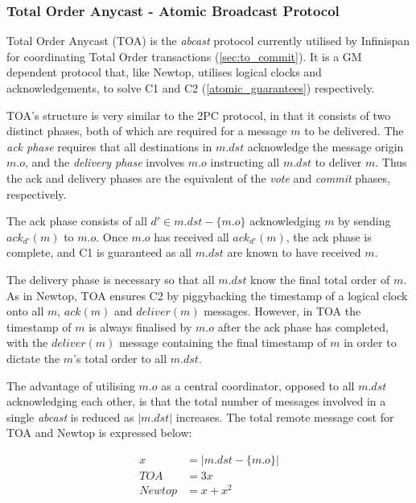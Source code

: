 	        \subsubsection{Total Order Anycast - Atomic Broadcast Protocol}
	        Total Order Anycast (TOA)\cite{Ruivo:2011:ETO:2120967.2121604} is the \emph{abcast} protocol currently utilised by Infinispan for coordinating Total Order transactions (\ref{sec:to_commit}).  It is a GM dependent protocol that, like Newtop\citep{Ezhilchelvan:1995:NFG:876885.880005}, utilises logical clocks and acknowledgements, to solve C1 and C2 (\ref{atomic_guarantees}) respectively.  
	        
			TOA's structure is very similar to the 2PC protocol, in that it consists of two distinct phases, both of which are required for a message $m$ to be delivered.  The \emph{ack phase} requires that all destinations in $m.dst$ acknowledge the message origin $m.o$, and the \emph{delivery phase} involves $m.o$ instructing all $m.dst$ to deliver $m$.  Thus the ack and delivery phases are the equivalent of the \emph{vote} and \emph{commit} phases, respectively.  
	        
			The ack phase consists of all $d' \in m.dst-\{m.o\}$ acknowledging $m$ by sending $ack_{d'}(m)$ to $m.o$.  Once $m.o$ has received all $ack_{d'}(m)$, the ack phase is complete, and C1 is guaranteed as all $m.dst$ are known to have received $m$.  
			
			The delivery phase is necessary so that all $m.dst$ know the final total order of $m$.  As in Newtop, TOA ensures C2 by piggybacking the timestamp of a logical clock onto all $m$, $ack(m)$ and $deliver(m)$ messages.  However, in TOA the timestamp of $m$ is always finalised by $m.o$ after the ack phase has completed, with the $deliver(m)$ message containing the final timestamp of $m$ in order to dictate the $m$'s total order to all $m.dst$.  
			
			The advantage of utilising $m.o$ as a central coordinator, opposed to all $m.dst$ acknowledging each other, is that the total number of messages involved in a single \emph{abcast} is reduced as $\left\vert m.dst \right\vert$ increases.  The total remote message cost for TOA and Newtop is expressed below:
			
			\begin{equation*}
		     \begin{aligned}
		       x &= \left\vert m.dst-\{m.o\} \right\vert \\
		       TOA & = 3x \\
		       Newtop & = x + x^2
		     \end{aligned}
		    \end{equation*}

